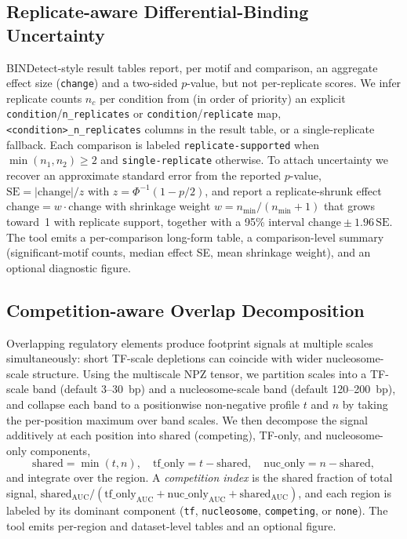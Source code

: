 \documentclass[biomedinformatics,article,submit,pdftex,moreauthors]{Definitions/mdpi}
\begin{document}
\subsection{Replicate-aware Differential-Binding Uncertainty}
\label{sec:replicate}

BINDetect-style result tables report, per motif and comparison, an aggregate
effect size (\texttt{change}) and a two-sided $p$-value, but not per-replicate
scores. We infer replicate counts $n_c$ per condition from (in order of priority)
an explicit \texttt{condition}/\texttt{n\_replicates} or
\texttt{condition}/\texttt{replicate} map, \texttt{<condition>\_n\_replicates}
columns in the result table, or a single-replicate fallback. Each comparison is
labeled \texttt{replicate-supported} when $\min(n_1,n_2)\ge 2$ and
\texttt{single-replicate} otherwise. To attach uncertainty we recover an
approximate standard error from the reported $p$-value, $\mathrm{SE} =
|\text{change}|/z$ with $z = \Phi^{-1}(1-p/2)$, and report a replicate-shrunk
effect $\widehat{\text{change}} = w\cdot\text{change}$ with shrinkage weight
$w = n_\text{min}/(n_\text{min}+1)$ that grows toward~1 with replicate support,
together with a 95\% interval $\text{change}\pm 1.96\,\mathrm{SE}$. The tool emits
a per-comparison long-form table, a comparison-level summary (significant-motif
counts, median effect SE, mean shrinkage weight), and an optional diagnostic
figure.

\subsection{Competition-aware Overlap Decomposition}
\label{sec:competition}

Overlapping regulatory elements produce footprint signals at multiple scales
simultaneously: short TF-scale depletions can coincide with wider
nucleosome-scale structure. Using the multiscale NPZ tensor, we partition scales
into a TF-scale band (default 3--30~bp) and a nucleosome-scale band (default
120--200~bp), and collapse each band to a positionwise non-negative profile
$t$ and $n$ by taking the per-position maximum over band scales. We then
decompose the signal additively at each position into shared (competing),
TF-only, and nucleosome-only components,
\[
\text{shared} = \min(t,n),\quad
\text{tf\_only} = t-\text{shared},\quad
\text{nuc\_only} = n-\text{shared},
\]
and integrate over the region. A \emph{competition index} is the shared fraction
of total signal, $\text{shared}_\text{AUC}/(\text{tf\_only}_\text{AUC}+
\text{nuc\_only}_\text{AUC}+\text{shared}_\text{AUC})$, and each region is labeled
by its dominant component (\texttt{tf}, \texttt{nucleosome}, \texttt{competing},
or \texttt{none}). The tool emits per-region and dataset-level tables and an
optional figure.
\end{document}
